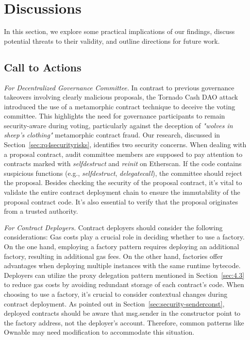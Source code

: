 \documentclass[acmsmall,screen]{acmart}
\begin{document}
	\section{Discussions}\label{sec:discussions}
	In this section, we explore some practical implications of our findings, discuss potential threats to their validity, and outline directions for future work.
	\subsection{Call to Actions}
	\textit{For Decentralized Governance Committee.} In contrast to previous governance takeovers involving clearly malicious proposals, the Tornado Cash DAO attack introduced the use of a metamorphic contract technique to deceive the voting committee. This highlights the need for governance participants to remain security-aware during voting, particularly against the deception of \textit{"wolves in sheep's clothing"} metamorphic contract fraud. Our research, discussed in Section~\ref{sec:rq4securityrisks}, identifies two security concerns.  When dealing with a proposal contract, audit committee members are supposed to pay attention to contracts marked with \textit{selfdestruct} and \textit{reinit} on Etherscan. If the code contains suspicious functions (e.g., \textit{selfdestruct}, \textit{delegatecall}), the committee should reject the proposal.
	 Besides checking the security of the proposal contract, it's vital to validate the entire contract deployment chain to ensure the immutability of the proposal contract code.  It's also essential to verify that the proposal originates from a trusted authority.

	\textit{For Contract Deployers.} Contract deployers should consider the following considerations:  Gas costs play a crucial role in deciding whether to use a factory. On the one hand, employing a factory pattern requires deploying an additional factory, resulting in additional gas fees. On the other hand, factories offer advantages when deploying multiple instances with the same runtime bytecode. Deployers can utilize the proxy delegation pattern mentioned in Section~\ref{sec:4.3} to reduce gas costs by avoiding redundant storage of each contract's code.  When choosing to use a factory, it's crucial to consider contextual changes during contract deployment. As pointed out in Section~\ref{sec:security-senderconst}, deployed contracts should be aware that msg.sender in the constructor point to the factory address, not the deployer's account. Therefore, common patterns like Ownable may need modification to accommodate this situation.
\end{document}
